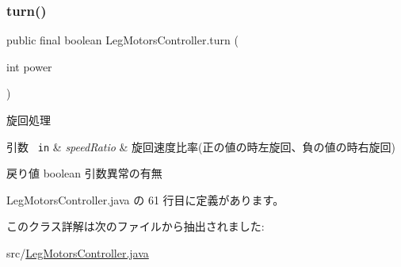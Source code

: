 \subsubsection{\texorpdfstring{turn()}{turn()}}
{\footnotesize\ttfamily public final boolean Leg\+Motors\+Controller.\+turn (\begin{DoxyParamCaption}\item[{int}]{power }\end{DoxyParamCaption})\hspace{0.3cm}{\ttfamily [inline]}}



旋回処理 


\begin{DoxyParams}[1]{引数}
\mbox{\texttt{ in}}  & {\em speed\+Ratio} & 旋回速度比率(正の値の時左旋回、負の値の時右旋回) \\
\hline
\end{DoxyParams}
\begin{DoxyReturn}{戻り値}
boolean 引数異常の有無 
\end{DoxyReturn}


 Leg\+Motors\+Controller.\+java の 61 行目に定義があります。



このクラス詳解は次のファイルから抽出されました\+:\begin{DoxyCompactItemize}
\item 
src/\mbox{\hyperlink{_leg_motors_controller_8java}{Leg\+Motors\+Controller.\+java}}\end{DoxyCompactItemize}
